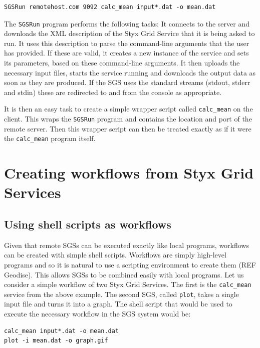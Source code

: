 \documentclass{llncs}
\begin{document}
\begin{verbatim}
SGSRun remotehost.com 9092 calc_mean input*.dat -o mean.dat
\end{verbatim}

The {\tt SGSRun} program performs the following tasks:  It connects to the server and downloads the XML description of the Styx Grid Service that it is being asked to run.  It uses this description to parse the command-line arguments that the user has provided.  If these are valid, it creates a new instance of the service and sets its parameters, based on these command-line arguments.  It then uploads the necessary input files, starts the service running and downloads the output data as soon as they are produced.  If the SGS uses the standard streams (stdout, stderr and stdin) these are redirected to and from the console as appropriate.

It is then an easy task to create a simple wrapper script called {\tt calc\_mean} on the client.  This wraps the {\tt SGSRun} program and contains the location and port of the remote server.  Then this wrapper script can then be treated exactly as if it were the {\tt calc\_mean} program itself.


\section{Creating workflows from Styx Grid Services}

\subsection{Using shell scripts as workflows}\label{sec:shellscripts}
Given that remote SGSs can be executed exactly like local programs, workflows can be created with simple shell scripts.  Workflows are simply high-level programs and so it is natural to use a scripting environment to create them (REF Geodise).  This allows SGSs to be combined easily with local programs.  Let us consider a simple workflow of two Styx Grid Services.  The first is the {\tt calc\_mean} service from the above example.  The second SGS, called {\tt plot}, takes a single input file and turns it into a graph.  The shell script that would be used to execute the necessary workflow in the SGS system would be:

\begin{verbatim}
calc_mean input*.dat -o mean.dat
plot -i mean.dat -o graph.gif
\end{verbatim}
\end{document}

